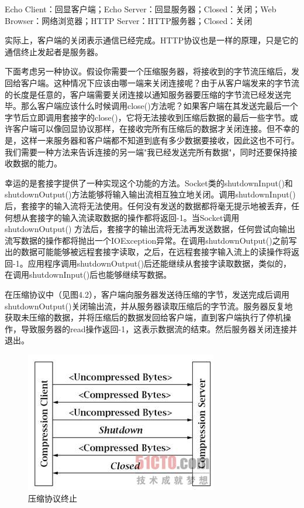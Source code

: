 	Echo Client：回显客户端；Echo Server：回显服务器；Closed：关闭；Web Browser：网络浏览器；HTTP Server：HTTP服务器；Closed：关闭 

	实际上，客户端的关闭表示通信已经完成。HTTP协议也是一样的原理，只是它的通信终止发起者是服务器。 

	下面考虑另一种协议。假设你需要一个压缩服务器，将接收到的字节流压缩后，发回给客户端。这种情况下应该由哪一端来关闭连接呢？由于从客户端发来的字节流的长度是任意的，客户端需要关闭连接以通知服务器要压缩的字节流已经发送完毕。那么客户端应该什么时候调用close()方法呢？如果客户端在其发送完最后一个字节后立即调用套接字的close()，它将无法接收到压缩后数据的最后一些字节。或许客户端可以像回显协议那样，在接收完所有压缩后的数据才关闭连接。但不幸的是，这样一来服务器和客户端都不知道到底有多少数据要接收，因此这也不可行。我们需要一种方法来告诉连接的另一端"我已经发送完所有数据"，同时还要保持接收数据的能力。 

	幸运的是套接字提供了一种实现这个功能的方法。Socket类的shutdownInput()和shutdownOutput()方法能够将输入输出流相互独立地关闭。调用shutdownInput()后，套接字的输入流将无法使用。任何没有发送的数据都将毫无提示地被丢弃，任何想从套接字的输入流读取数据的操作都将返回-1。当Socket调用shutdownOutput() 方法后，套接字的输出流将无法再发送数据，任何尝试向输出流写数据的操作都将抛出一个IOException异常。在调用shutdownOutput()之前写出的数据可能能够被远程套接字读取，之后，在远程套接字输入流上的读操作将返回-1。应用程序调用shutdownOutput()后还能继续从套接字读取数据，类似的，在调用shutdownInput()后也能够继续写数据。 

	在压缩协议中（见图4.2），客户端向服务器发送待压缩的字节，发送完成后调用shutdownOutput()关闭输出流，并从服务器读取压缩后的字节流。服务器反复地获取未压缩的数据，并将压缩后的数据发回给客户端，直到客户端执行了停机操作，导致服务器的read操作返回-1，这表示数据流的结束。然后服务器关闭连接并退出。 

	\begin{figure}[htbp]%
		\centering
		\includegraphics[scale=.8]{img/04.02.jpg}
		\caption{压缩协议终止}
		\label{fig:copose.pot.end}
	\end{figure}

